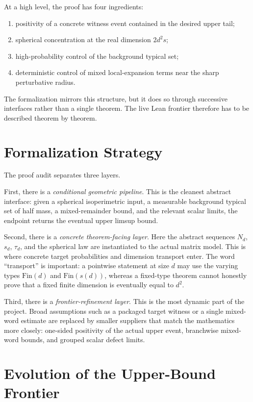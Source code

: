 \documentclass[11pt]{article}
\begin{document}
At a high level, the proof has four ingredients:
\begin{enumerate}[leftmargin=*]
  \item positivity of a concrete witness event contained in the desired upper
  tail;
  \item spherical concentration at the real dimension \(2 d^2 s\);
  \item high-probability control of the background typical set;
  \item deterministic control of mixed local-expansion terms near the sharp
  perturbative radius.
\end{enumerate}

The formalization mirrors this structure, but it does so through successive
interfaces rather than a single theorem.  The live Lean frontier therefore has
to be described theorem by theorem.

\section{Formalization Strategy}

The proof audit separates three layers.

First, there is a \emph{conditional geometric pipeline}.  This is the cleanest
abstract interface: given a spherical isoperimetric input, a measurable
background typical set of half mass, a mixed-remainder bound, and the relevant
scalar limits, the endpoint returns the eventual upper limsup bound.

Second, there is a \emph{concrete theorem-facing layer}.  Here the abstract
sequences \(N_d\), \(s_d\), \(\tau_d\), and the spherical law are instantiated
to the actual matrix model.  This is where concrete target probabilities and
dimension transport enter.  The word ``transport'' is important: a pointwise
statement at size \(d\) may use the varying types \(\mathrm{Fin}(d)\) and
\(\mathrm{Fin}(s(d))\), whereas a fixed-type theorem cannot honestly prove
that a fixed finite dimension is eventually equal to \(d^2\).

Third, there is a \emph{frontier-refinement layer}.  This is the most dynamic
part of the project.  Broad assumptions such as a packaged target witness or a
single mixed-word estimate are replaced by smaller suppliers that match the
mathematics more closely: one-sided positivity of the actual upper event,
branchwise mixed-word bounds, and grouped scalar defect limits.

\section{Evolution of the Upper-Bound Frontier}
\end{document}
